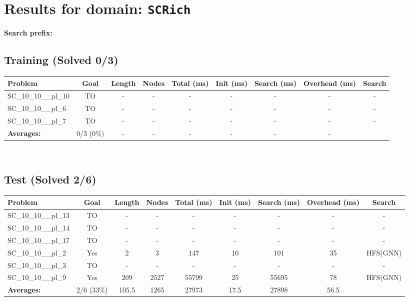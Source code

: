 \documentclass{article}
\begin{document}
\section*{Results for domain: \texttt{SCRich}}
\textbf{Search prefix:} 
\\[0.5cm]
\subsection*{Training (Solved 0/3)}
\begin{tabular}{lcccccccc}
\toprule
Problem & Goal & Length & Nodes & Total (ms) & Init (ms) & Search (ms) & Overhead (ms) & Search \\
\midrule
SC\_10\_10\_\_pl\_10 & TO & - & - & - & - & - & - & - \\
SC\_10\_10\_\_pl\_6 & TO & - & - & - & - & - & - & - \\
SC\_10\_10\_\_pl\_7 & TO & - & - & - & - & - & - & - \\
\textbf{Averages:} & 0/3 (0\%) & - & - & - & - & - & - & \\
\bottomrule
\end{tabular}
\\[0.7cm]
\subsection*{Test (Solved 2/6)}
\begin{tabular}{lcccccccc}
\toprule
Problem & Goal & Length & Nodes & Total (ms) & Init (ms) & Search (ms) & Overhead (ms) & Search \\
\midrule
SC\_10\_10\_\_pl\_13 & TO & - & - & - & - & - & - & - \\
SC\_10\_10\_\_pl\_14 & TO & - & - & - & - & - & - & - \\
SC\_10\_10\_\_pl\_17 & TO & - & - & - & - & - & - & - \\
SC\_10\_10\_\_pl\_2 & Yes & 2 & 3 & 147 & 10 & 101 & 35 & HFS(GNN) \\
SC\_10\_10\_\_pl\_3 & TO & - & - & - & - & - & - & - \\
SC\_10\_10\_\_pl\_9 & Yes & 209 & 2527 & 55799 & 25 & 55695 & 78 & HFS(GNN) \\
\textbf{Averages:} & 2/6 (33\%) & 105.5 & 1265 & 27973 & 17.5 & 27898 & 56.5 & \\
\bottomrule
\end{tabular}
\\[0.7cm]
\end{document}
